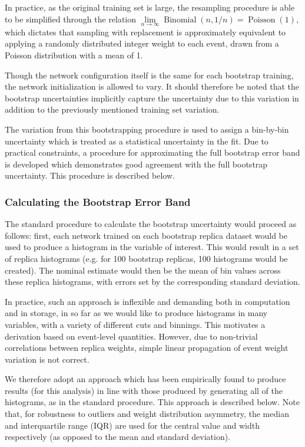 In practice, as the original training set is large, the resampling procedure is
able to be simplified through the relation $\lim\limits_{n\rightarrow \infty}
	\operatorname{Binomial}(n, 1/n) = \operatorname{Poisson}(1)$, which dictates that sampling
with replacement is approximately equivalent to applying a randomly distributed
integer weight to each event, drawn from a Poisson distribution with a mean of
1.

Though the network configuration itself is the same for each bootstrap training, the
network initialization is allowed to vary. It should therefore be noted that the bootstrap
uncertainties implicitly capture the uncertainty due to this variation in addition to
the previously mentioned training set variation.

The variation from this bootstrapping procedure is used to assign a bin-by-bin uncertainty
which is treated as a statistical uncertainty in the fit. Due to practical constraints,
a procedure for approximating the full bootstrap error band is developed which demonstrates
good agreement with the full bootstrap uncertainty. This procedure is described below.

\subsubsection{Calculating the Bootstrap Error Band}
The standard procedure to calculate the bootstrap uncertainty would proceed as 
follows: first, each network trained on each bootstrap replica dataset would be used
to produce a histogram in the variable of interest. This would result in a set of 
replica histograms (e.g. for 100 bootstrap replicas, 100 histograms would be created). 
The nominal estimate would then be the mean of bin values across these replica histograms, 
with errors set by the corresponding standard deviation.

In practice, such an approach is inflexible and demanding both in computation and 
in storage, in so far as we would like to produce histograms in many variables, with a 
variety of different cuts and binnings. This motivates a derivation based on event-level 
quantities. However, due to non-trivial correlations between replica weights, simple linear 
propagation of event weight variation is not correct.

We therefore adopt an approach which has been empirically found to produce results (for this
analysis) in line with those produced by generating all of the histograms, as in the standard 
procedure. This approach is described below. Note that, for robustness to outliers and weight distribution 
asymmetry, the median and interquartile range (IQR) are used for the central value and width 
respectively (as opposed to the mean and standard deviation).

